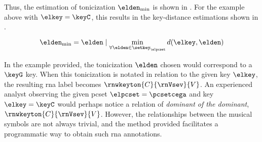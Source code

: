 Thus, the estimation of tonicization $\elden_{\min}$ is
shown in . For the example
above with $\elkey = \keyC$, this results in the
key-distance estimations shown in
.

\begin{equation}
    \label{eq:tonicization_estimation}
    \elden_{\min} = \elden \mid \min_{\forall \elden \in \setkey_\elpcset} d(\elkey, \elden)
\end{equation}


In the example provided, the tonicization $\elden$ chosen
would correspond to a $\keyG$ key. When this tonicization is
notated in relation to the given key $\elkey$, the resulting
\gls{rna} label becomes $\rnwkeyton{C}{\rnVsev}{V}$. An
experienced analyst observing the given \gls{pcset}
$\elpcset = \pcsetcega$ and key $\elkey = \keyC$ would
perhaps notice a relation of \emph{dominant of the
dominant}, $\rnwkeyton{C}{\rnVsev}{V}$. However, the
relationships between the musical symbols are not always
trivial, and the method provided facilitates a programmatic
way to obtain such \gls{rna} annotations.
